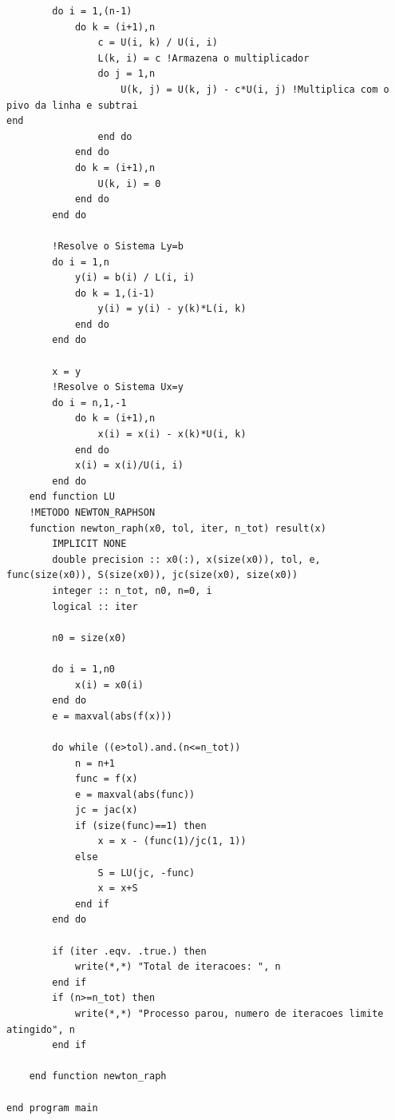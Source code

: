 \documentclass[a4paper, 12pt, openright, oneside]{article}
\begin{document}
\begin{lstlisting}
        do i = 1,(n-1)
            do k = (i+1),n
                c = U(i, k) / U(i, i)
                L(k, i) = c !Armazena o multiplicador
                do j = 1,n
                    U(k, j) = U(k, j) - c*U(i, j) !Multiplica com o pivo da linha e subtrai
end
                end do
            end do
            do k = (i+1),n
                U(k, i) = 0
            end do
        end do
        
        !Resolve o Sistema Ly=b
        do i = 1,n
            y(i) = b(i) / L(i, i)
            do k = 1,(i-1)
                y(i) = y(i) - y(k)*L(i, k)
            end do
        end do

        x = y
        !Resolve o Sistema Ux=y
        do i = n,1,-1
            do k = (i+1),n
                x(i) = x(i) - x(k)*U(i, k)
            end do
            x(i) = x(i)/U(i, i)
        end do
    end function LU
    !METODO NEWTON_RAPHSON
    function newton_raph(x0, tol, iter, n_tot) result(x)
        IMPLICIT NONE
        double precision :: x0(:), x(size(x0)), tol, e, func(size(x0)), S(size(x0)), jc(size(x0), size(x0))
        integer :: n_tot, n0, n=0, i
        logical :: iter

        n0 = size(x0)

        do i = 1,n0
            x(i) = x0(i)
        end do
        e = maxval(abs(f(x)))

        do while ((e>tol).and.(n<=n_tot))
            n = n+1
            func = f(x)
            e = maxval(abs(func))
            jc = jac(x)
            if (size(func)==1) then
                x = x - (func(1)/jc(1, 1))
            else
                S = LU(jc, -func)
                x = x+S
            end if
        end do

        if (iter .eqv. .true.) then
            write(*,*) "Total de iteracoes: ", n
        end if
        if (n>=n_tot) then
            write(*,*) "Processo parou, numero de iteracoes limite atingido", n
        end if

    end function newton_raph

end program main
\end{lstlisting}
\newpage
\end{document}
